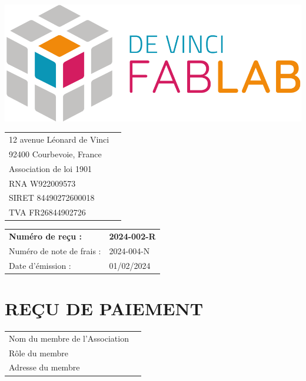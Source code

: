\documentclass[11pt,a4paper]{article}
\begin{document}
\begin{minipage}{0.4\textwidth}
    \includegraphics[width=0.7\linewidth]{../../assets/logo_fablab.png}

    \vspace{0.5cm}

    \begin{tabular}{ll}
        12 avenue Léonard de Vinci \\
        92400 Courbevoie, France   \\
        Association de loi 1901    \\
        RNA W922009573             \\
        SIRET 84490272600018       \\
        TVA  FR26844902726         \\
    \end{tabular}
\end{minipage}\begin{minipage}{0.6\textwidth}
    \begin{flushright}
        \begin{tabular}{ll}
            \textbf{Numéro de reçu :} & \textbf{2024-002-R} \\
            Numéro de note de frais : & 2024-004-N          \\
            Date d'émission :         & 01/02/2024          \\
        \end{tabular}
    \end{flushright}
\end{minipage}



\begin{minipage}[t]{0.5\textwidth}
    \hspace*{0pt}\vspace*{\fill}
    \section*{\LARGE REÇU DE PAIEMENT}
\end{minipage}\begin{minipage}[t]{0.5\textwidth}
    \begin{framed}
        \begin{tabular}{ll}
            Nom du membre de l'Association \\
            Rôle du membre                 \\
            Adresse du membre              \\
        \end{tabular}
    \end{framed}
    \vspace{0.1cm}
\end{minipage}
\end{document}
